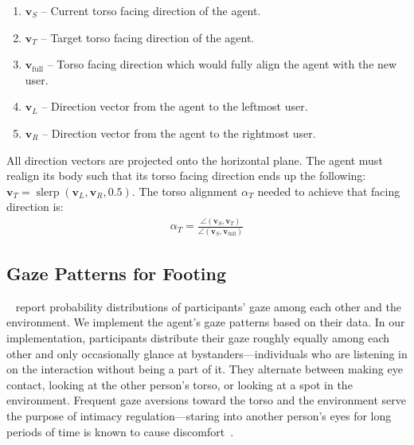 \begin{enumerate}
\item $\mathbf{v}_S$ -- Current torso facing direction of the agent.
\item $\mathbf{v}_T$ -- Target torso facing direction of the agent.
\item $\mathbf{v}_\mathrm{full}$ -- Torso facing direction which would fully align the agent with the new user.
\item $\mathbf{v}_L$ -- Direction vector from the agent to the leftmost user.
\item $\mathbf{v}_R$ -- Direction vector from the agent to the rightmost user.
\end{enumerate}

All direction vectors are projected onto the horizontal plane. The agent must realign its body such that its torso facing direction ends up the following: $\mathbf{v}_T = \mathop{slerp}(\mathbf{v}_L, \mathbf{v}_R, 0.5)$. The torso alignment $\alpha_T$ needed to achieve that facing direction is:
%
\begin{align} \label{eq:FTorsoAlign}
\alpha_T = \frac{\angle(\mathbf{v}_S, \mathbf{v}_T)}{\angle(\mathbf{v}_S, \mathbf{v}_\mathrm{full})}
\end{align}
%

\subsection{Gaze Patterns for Footing}

~\citet{mutlu2012conversational} report probability distributions of participants' gaze among each other and the environment. We implement the agent's gaze patterns based on their data. In our implementation, participants distribute their gaze roughly equally among each other and only occasionally glance at bystanders---individuals who are listening in on the interaction without being a part of it. They alternate between making eye contact, looking at the other person's torso, or looking at a spot in the environment. Frequent gaze aversions toward the torso and the environment serve the purpose of intimacy regulation---staring into another person's eyes for long periods of time is known to cause discomfort~\citep{argyle1976gaze}.

